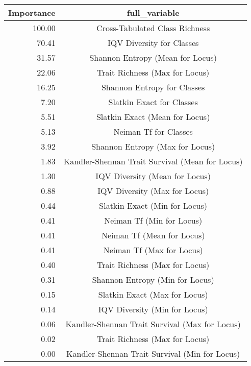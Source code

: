 \begin{tabular}{|r|c|}
  \hline
Importance & full\_variable \\ 
  \hline
100.00 & Cross-Tabulated Class Richness \\ 
  70.41 & IQV Diversity for Classes \\ 
  31.57 & Shannon Entropy (Mean for Locus) \\ 
  22.06 & Trait Richness (Max for Locus) \\ 
  16.25 & Shannon Entropy for Classes \\ 
  7.20 & Slatkin Exact for Classes \\ 
  5.51 & Slatkin Exact (Mean for Locus) \\ 
  5.13 & Neiman Tf for Classes \\ 
  3.92 & Shannon Entropy (Max for Locus) \\ 
  1.83 & Kandler-Shennan Trait Survival (Mean for Locus) \\ 
  1.30 & IQV Diversity (Mean for Locus) \\ 
  0.88 & IQV Diversity (Max for Locus) \\ 
  0.44 & Slatkin Exact (Min for Locus) \\ 
  0.41 & Neiman Tf (Min for Locus) \\ 
  0.41 & Neiman Tf (Mean for Locus) \\ 
  0.41 & Neiman Tf (Max for Locus) \\ 
  0.40 & Trait Richness (Max for Locus) \\ 
  0.31 & Shannon Entropy (Min for Locus) \\ 
  0.15 & Slatkin Exact (Max for Locus) \\ 
  0.14 & IQV Diversity (Min for Locus) \\ 
  0.06 & Kandler-Shennan Trait Survival (Max for Locus) \\ 
  0.02 & Trait Richness (Max for Locus) \\ 
  0.00 & Kandler-Shennan Trait Survival (Min for Locus) \\ 
   \hline
\end{tabular}
